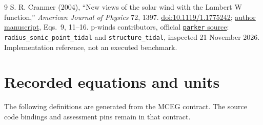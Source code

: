 \documentclass[10pt,a4paper]{article}
\begin{document}
\begin{thebibliography}{9}
 S. R. Cranmer (2004), ``New views of the solar wind with the
Lambert W function,'' \emph{American Journal of Physics} 72, 1397.
\href{https://doi.org/10.1119/1.1775242}{doi:10.1119/1.1775242};
\href{https://arxiv.org/pdf/astro-ph/0406176}{author manuscript}, Eqs.~9, 11--16.
 p-winds contributors, official
\href{https://p-winds.readthedocs.io/en/latest/_modules/parker.html}{\texttt{parker} source}:
\texttt{radius\_sonic\_point\_tidal} and \texttt{structure\_tidal},
inspected 21 November 2026. Implementation reference, not an executed benchmark.
\end{thebibliography}

\clearpage
\appendix
\section{Recorded equations and units}
\small
The following definitions are generated from the MCEG contract. The source
code bindings and assessment pins remain in that contract.

\end{document}
